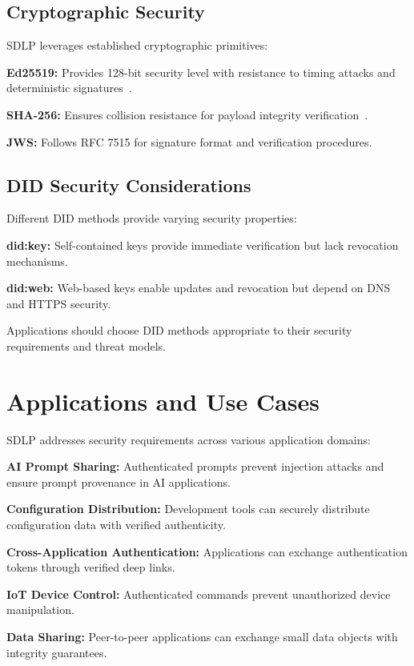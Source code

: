 \documentclass[conference]{IEEEtran}
\begin{document}
\subsection{Cryptographic Security}

SDLP leverages established cryptographic primitives:

\textbf{Ed25519:} Provides 128-bit security level with resistance to timing attacks and deterministic signatures~\cite{ed25519}.

\textbf{SHA-256:} Ensures collision resistance for payload integrity verification~\cite{sha256-security}.

\textbf{JWS:} Follows RFC 7515 for signature format and verification procedures.

\subsection{DID Security Considerations}

Different DID methods provide varying security properties:

\textbf{did:key:} Self-contained keys provide immediate verification but lack revocation mechanisms.

\textbf{did:web:} Web-based keys enable updates and revocation but depend on DNS and HTTPS security.

Applications should choose DID methods appropriate to their security requirements and threat models.

\section{Applications and Use Cases}

SDLP addresses security requirements across various application domains:

\textbf{AI Prompt Sharing:} Authenticated prompts prevent injection attacks and ensure prompt provenance in AI applications.

\textbf{Configuration Distribution:} Development tools can securely distribute configuration data with verified authenticity.

\textbf{Cross-Application Authentication:} Applications can exchange authentication tokens through verified deep links.

\textbf{IoT Device Control:} Authenticated commands prevent unauthorized device manipulation.

\textbf{Data Sharing:} Peer-to-peer applications can exchange small data objects with integrity guarantees.
\end{document}
